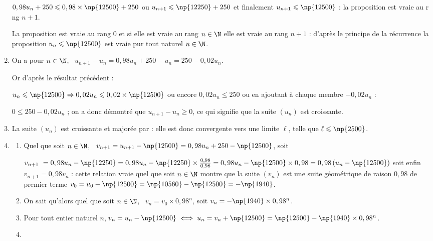\begin{enumerate}
$0,98u_n + 250  \leqslant 0,98 \times \np{12500} + 250$ ou $u_{n+1}  \leqslant \np{12250} + 250 $ et finalement $u_{n+1} \leqslant \np{12500}$ : la proposition est vraie au r	ng $n + 1$.

La proposition est vraie au rang 0 et si elle est vraie au rang $n \in \N$ elle est vraie au rang $n + 1$ : d'après le principe de la récurrence la proposition $u_n \leqslant \np{12500}$ est vraie pur tout naturel $n \in \N$.
\item %
On a pour $n \in \N$, \, $u_{n+1} - u_n = 0,98u_n + 250 - u_n = 250  - 0,02u_n$.

Or d'après le résultat précédent :

$u_n \leqslant \np{12500} \Rightarrow 0,02u_n \leqslant 0,02 \times \np{12500}$ ou encore $0,02u_n \leqslant 250$ ou en ajoutant à chaque membre $- 0,02u_n$ :

$0 \leqslant 250 - 0,02u_n$ ; on a donc démontré que $u_{n+1} - u_n  \geqslant 0$, ce qui signifie que la suite $\left(u_n\right)$ est croissante.
\item %
La suite $\left(u_n\right)$ est croissante et majorée par  : elle est donc convergente vers une limite $\ell$, telle que $\ell \leqslant \np{2500}$.
\item %
	\begin{enumerate}
		\item %
		Quel que soit $n \in \N$, \, $v_{n+1} = u_{n+1} - \np{12500} = 0,98u_n + 250 - \np{12500}$, soit 
		
		$v_{n+1}  = 0,98u_n - \np{12250} = 0,98u_n - \np{12250}\times \frac{0,98}{0,98} = 0,98u_n - \np{12500} \times 0,98 = 0,98\left(u_n - \np{12500}\right)$ soit enfin $v_{n+1} = 0,98v_n$ : cette relation vraie quel que soit $n \in \N$ montre que la suite $\left(v_n\right)$ est une suite géométrique de raison $0,98$ de premier terme $v_0 = u_0 - \np{12500} = \np{10560} - \np{12500} = - \np{1940}$.
		\item %
		On sait qu'alors quel que soit $n \in \N$, \, $v_n = v_0 \times 0,98^n$, soit $v_n = - \np{1940} \times 0,98^n$.
		\item %
Pour tout entier naturel $n$,\,$v_n = u_n - \np{12500} \iff u_n = v_n + \np{12500} = \np{12500} - \np{1940} \times 0,98^n$.
		\item %
		

\end{enumerate}
\end{enumerate}
